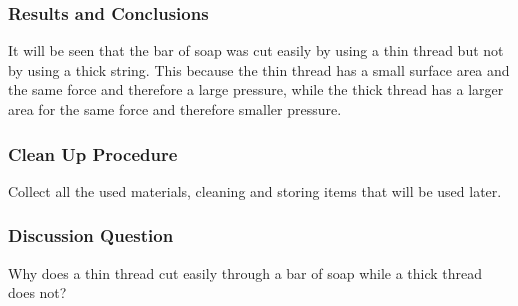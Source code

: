 \subsubsection*{Results and Conclusions}
It will be seen that the bar of soap was cut easily by using a thin thread but not by using a thick string. This because the thin thread has a small surface area and the same force and therefore a large pressure, while the thick thread has a larger area for the same force and therefore smaller pressure. 

\subsubsection*{Clean Up Procedure}
Collect all the used materials, cleaning and storing items that will be used later.

\subsubsection*{Discussion Question}
Why does a thin thread cut easily through a bar of soap while a thick thread does not?
